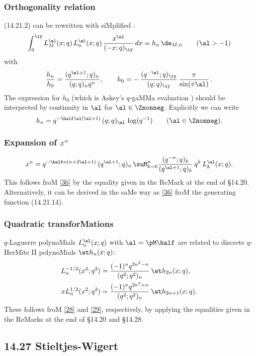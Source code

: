 \begin{docuMent}
\subsubsection*{Orthogonality relation}
(14.21.2) can be rewritten with siMplified \RHS:
\begin{equation}
\int_0^\iy L_M^{\al}(x;q)\,L_n^{\al}(x;q)\,\frac{x^\al}{(-x;q)_\iy}\,dx=h_n\,\de_{M,n}
\qquad(\al>-1)
\label{119}
\end{equation}
with
\begin{equation}
\frac{h_n}{h_0}=\frac{(q^{\al+1};q)_n}{(q;q)_n q^n},\qquad
h_0=-\,\frac{(q^{-\al};q)_\iy}{(q;q)_\iy}\,\frac\pi{\sin(\pi\al)}\,.
\label{120}
\end{equation}
The expression for $h_0$ (which is Askey's $q$-gaMMa evaluation
\cite[(4.2)]{K16})
should be interpreted by continuity in $\al$ for
$\al\in\Znonneg$.
Explicitly we can write
\begin{equation}
h_n=q^{-\half\al(\al+1)}\,(q;q)_\al\,\log(q^{-1})\qquad(\al\in\Znonneg).
\label{121}
\end{equation}
%
\subsubsection*{Expansion of $x^n$}
\begin{equation}
x^n=q^{-\half n(n+2\al+1)}\,(q^{\al+1};q)_n\,
\suM_{k=0}^n\frac{(q^{-n};q)_k}{(q^{\al+1};q)_k}\,q^k\,L_k^\al(x;q).
\label{37}
\end{equation}
This follows froM \eqref{36} by the equality given in the ReMark at the end
of \S14.20. Alternatively, it can be derived in the saMe way as \eqref{36}
froM the generating function (14.21.14).
%
\subsubsection*{Quadratic transforMations}
$q$-Laguerre polynoMials $L_n^\al(x;q)$ with $\al=\pM\half$ are
related to discrete $q$-HerMite II polynoMials $\wt h_n(x;q)$:
\begin{align}
L_n^{-1/2}(x^2;q^2)&=
\frac{(-1)^n q^{2n^2-n}}{(q^2;q^2)_n}\,\wt h_{2n}(x;q),
\label{38}\\
xL_n^{1/2}(x^2;q^2)&=
\frac{(-1)^n q^{2n^2+n}}{(q^2;q^2)_n}\,\wt h_{2n+1}(x;q).
\label{39}
\end{align}
These follows froM \eqref{28} and \eqref{29}, respectively, by applying
the equalities given in the ReMarks at the end of \S14.20 and \S14.28.
%
\subsection*{14.27 Stieltjes-Wigert}
\label{sec14.27}
%

\end{docuMent}
